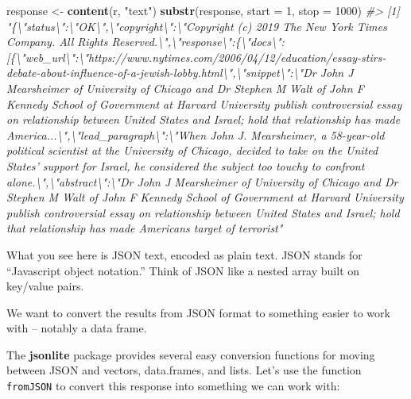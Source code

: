 \documentclass[]{book}
\newenvironment{Shaded}{\begin{snugshade}}{\end{snugshade}}
\newcommand{\CommentTok}[1]{\textcolor[rgb]{0.56,0.35,0.01}{\textit{#1}}}
\newcommand{\DataTypeTok}[1]{\textcolor[rgb]{0.13,0.29,0.53}{#1}}
\newcommand{\DecValTok}[1]{\textcolor[rgb]{0.00,0.00,0.81}{#1}}
\newcommand{\KeywordTok}[1]{\textcolor[rgb]{0.13,0.29,0.53}{\textbf{#1}}}
\newcommand{\NormalTok}[1]{#1}
\newcommand{\StringTok}[1]{\textcolor[rgb]{0.31,0.60,0.02}{#1}}
\begin{document}
\begin{Shaded}
\begin{Highlighting}[]
\NormalTok{response <-}\StringTok{ }\KeywordTok{content}\NormalTok{(r, }\StringTok{"text"}\NormalTok{)}
\KeywordTok{substr}\NormalTok{(response, }\DataTypeTok{start =} \DecValTok{1}\NormalTok{, }\DataTypeTok{stop =} \DecValTok{1000}\NormalTok{)}
\CommentTok{#> [1] "\{\textbackslash{}"status\textbackslash{}":\textbackslash{}"OK\textbackslash{}",\textbackslash{}"copyright\textbackslash{}":\textbackslash{}"Copyright (c) 2019 The New York Times Company. All Rights Reserved.\textbackslash{}",\textbackslash{}"response\textbackslash{}":\{\textbackslash{}"docs\textbackslash{}":[\{\textbackslash{}"web_url\textbackslash{}":\textbackslash{}"https://www.nytimes.com/2006/04/12/education/essay-stirs-debate-about-influence-of-a-jewish-lobby.html\textbackslash{}",\textbackslash{}"snippet\textbackslash{}":\textbackslash{}"Dr John J Mearsheimer of University of Chicago and Dr Stephen M Walt of John F Kennedy School of Government at Harvard University publish controversial essay on relationship between United States and Israel; hold that relationship has made America...\textbackslash{}",\textbackslash{}"lead_paragraph\textbackslash{}":\textbackslash{}"When John J. Mearsheimer, a 58-year-old political scientist at the University of Chicago, decided to take on the United States' support for Israel, he considered the subject too touchy to confront alone.\textbackslash{}",\textbackslash{}"abstract\textbackslash{}":\textbackslash{}"Dr John J Mearsheimer of University of Chicago and Dr Stephen M Walt of John F Kennedy School of Government at Harvard University publish controversial essay on relationship between United States and Israel; hold that relationship has made Americans target of terrorist"}
\end{Highlighting}
\end{Shaded}

What you see here is JSON text, encoded as plain text. JSON stands for ``Javascript object notation.'' Think of JSON like a nested array built on key/value pairs.

We want to convert the results from JSON format to something easier to work with -- notably a data frame.

The \textbf{jsonlite} package provides several easy conversion functions for moving between JSON and vectors, data.frames, and lists. Let's use the function \texttt{fromJSON} to convert this response into something we can work with:
\end{document}
